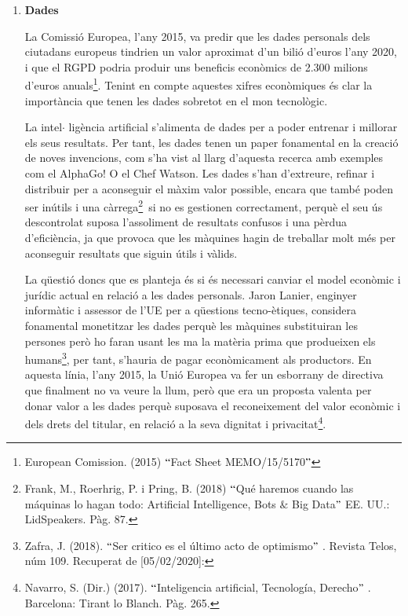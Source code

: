 \documentclass[12pt]{article}
\begin{document}
\vspace{\baselineskip}
\begin{enumerate}
	\item \textbf{Dades}\par


\vspace{\baselineskip}
\begin{justify}
La Comissió Europea, l’any 2015, va predir que les dades personals dels ciutadans europeus tindrien un valor aproximat d’un bilió d’euros l’any 2020, i que el RGPD podria produir uns beneficis econòmics de 2.300 milions d’euros anuals\footnote{ European Comission. (2015) $``$Fact Sheet MEMO/15/5170$"$  }. Tenint en compte aquestes xifres econòmiques és clar la importància que tenen les dades sobretot en el mon tecnològic. 
\end{justify}\par


\vspace{\baselineskip}
\begin{justify}
La intel$ \cdot $ ligència artificial s’alimenta de dades per a poder entrenar i millorar els seus resultats. Per tant, les dades tenen un paper fonamental en la creació de noves invencions, com s’ha vist al llarg d’aquesta recerca amb exemples com el AlphaGo! O el Chef Watson. Les dades s’han d’extreure, refinar i distribuir per a aconseguir el màxim valor possible, encara que també poden ser inútils i una càrrega\footnote{ Frank, M., Roerhrig, P. i Pring, B. (2018) $``$Qué haremos cuando las máquinas lo hagan todo: Artificial Intelligence, Bots $\&$  Big Data$"$  EE. UU.: LidSpeakers. Pàg. 87. }\ si no es gestionen correctament, perquè  el seu ús descontrolat suposa l’assoliment de resultats confusos i una pèrdua d’eficiència, ja que provoca que les màquines hagin de treballar molt més per aconseguir resultats que siguin útils i vàlids.
\end{justify}\par

\begin{justify}
La qüestió doncs que es planteja és si és necessari canviar el model econòmic i jurídic actual en relació a les dades personals. Jaron Lanier, enginyer informàtic i assessor de l’UE per a qüestions tecno-ètiques, considera fonamental monetitzar les dades perquè les màquines substituiran les persones però ho faran usant les ma la matèria prima que produeixen els humans\footnote{ Zafra, J. (2018). $``$Ser critico es el último acto de optimismo$"$ . Revista Telos, núm 109. Recuperat de [05/02/2020]:  }, per tant, s’hauria de pagar econòmicament als productors. En aquesta línia, l’any 2015, la Unió Europea va fer un esborrany de directiva que finalment no va veure la llum, però que era un proposta valenta per donar valor a les dades perquè suposava el reconeixement del valor econòmic i dels drets del titular, en relació a la seva dignitat i privacitat\footnote{ Navarro, S. (Dir.) (2017). $``$Inteligencia artificial, Tecnología, Derecho$"$ . Barcelona: Tirant lo Blanch. Pàg. 265.  }.
\end{justify}\par



\end{enumerate}
\end{document}
